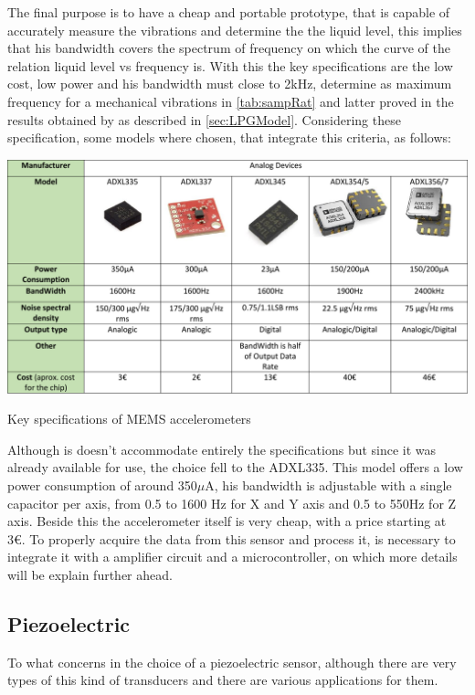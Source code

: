 The final purpose is to have a cheap and portable prototype, that is capable of accurately measure the vibrations and determine the the liquid level, this implies that his bandwidth covers the spectrum of frequency on which the curve of the relation liquid level vs frequency is. With this the key specifications are the low cost, low power and his bandwidth must close to 2kHz, determine as maximum frequency for a mechanical vibrations in \ref{tab:sampRat} and latter proved in the results obtained by \citeauthor{wuLiquidLevelDetector2014b} as described in \ref{sec:LPGModel}. Considering these specification, some models where chosen, that integrate this criteria, as follows:
\begin{table}
    \centering
    \includegraphics[width=1\textwidth]{Chapters/3CHP/Images/accTable.pdf}
    \caption{Key specifications of MEMS accelerometers}
    \label{fig:acctable}
\end{table}
Although is doesn't accommodate entirely the specifications but since it was already available for use, the choice fell to the ADXL335. This model offers a low power consumption of around 350$\mu$A, his bandwidth is adjustable with a single capacitor per axis, from 0.5 to 1600 Hz for X and Y axis and 0.5 to 550Hz for Z axis. Beside this the accelerometer itself is very cheap, with a price starting at 3€. To properly acquire the data from this sensor and process it, is necessary to integrate it with a amplifier circuit and a microcontroller, on which more details will be explain further ahead.
\subsection{Piezoelectric}
To what concerns in the choice of a piezoelectric sensor, although there are very types of this kind of transducers and there are various applications for them.  
